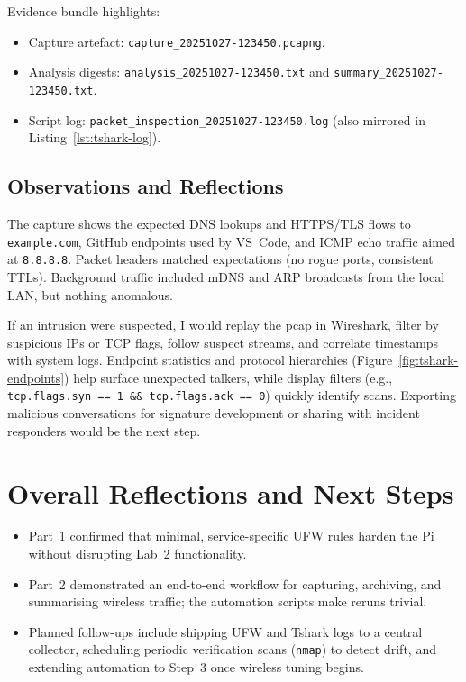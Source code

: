 \documentclass[11pt]{article}
\begin{document}
\noindent Evidence bundle highlights:
\begin{itemize}[leftmargin=*]
    \item Capture artefact: \texttt{capture\_20251027-123450.pcapng}.
    \item Analysis digests: \texttt{analysis\_20251027-123450.txt} and \texttt{summary\_20251027-123450.txt}.
    \item Script log: \texttt{packet\_inspection\_20251027-123450.log} (also mirrored in Listing~\ref{lst:tshark-log}).
\end{itemize}

\subsection{Observations and Reflections}
The capture shows the expected DNS lookups and HTTPS/TLS flows to \texttt{example.com}, GitHub endpoints used by VS~Code, and ICMP echo traffic aimed at \texttt{8.8.8.8}. Packet headers matched expectations (no rogue ports, consistent TTLs). Background traffic included mDNS and ARP broadcasts from the local LAN, but nothing anomalous.

If an intrusion were suspected, I would replay the pcap in Wireshark, filter by suspicious IPs or TCP flags, follow suspect streams, and correlate timestamps with system logs. Endpoint statistics and protocol hierarchies (Figure~\ref{fig:tshark-endpoints}) help surface unexpected talkers, while display filters (e.g., \texttt{tcp.flags.syn == 1 \&\& tcp.flags.ack == 0}) quickly identify scans. Exporting malicious conversations for signature development or sharing with incident responders would be the next step.

\section{Overall Reflections and Next Steps}
\begin{itemize}[leftmargin=*]
    \item Part~1 confirmed that minimal, service-specific UFW rules harden the Pi without disrupting Lab~2 functionality.
    \item Part~2 demonstrated an end-to-end workflow for capturing, archiving, and summarising wireless traffic; the automation scripts make reruns trivial.
    \item Planned follow-ups include shipping UFW and Tshark logs to a central collector, scheduling periodic verification scans (\texttt{nmap}) to detect drift, and extending automation to Step~3 once wireless tuning begins.
\end{itemize}
\end{document}
